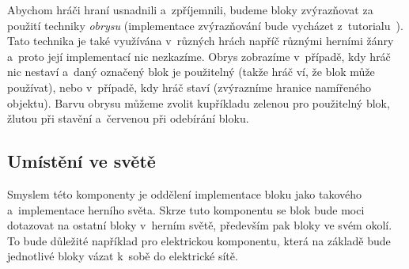 Abychom hráči hraní usnadnili a~zpříjemnili, budeme bloky zvýrazňovat za použití techniky \textit{obrysu} (implementace zvýrazňování bude vycházet z~tutorialu~\citep{ue_outline_tut}). Tato technika je také využívána v~různých hrách napříč různými herními žánry a~proto její implementací nic nezkazíme. Obrys zobrazíme v~případě, kdy hráč nic nestaví a~daný označený blok je použitelný (takže hráč ví, že blok může používat), nebo v~případě, kdy hráč staví (zvýrazníme hranice namířeného objektu). Barvu obrysu můžeme zvolit kupříkladu zelenou pro použitelný blok, žlutou při stavění a~červenou při odebírání bloku. 


\subsection{Umístění ve světě}

Smyslem této komponenty je oddělení implementace bloku jako takového a~implementace herního světa. Skrze tuto komponentu se blok bude moci dotazovat na ostatní bloky v~herním světě, především pak bloky ve svém okolí. To bude důležité například pro elektrickou komponentu, která na základě  bude jednotlivé bloky vázat k~sobě do elektrické sítě.






